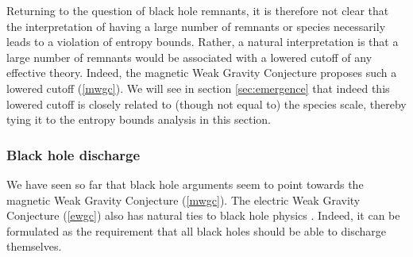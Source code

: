 \documentclass[11pt,a4paper]{article}
\numberwithin{equation}{section}
\numberwithin{table}{section}\setlength{\multlinegap}{25pt}
\begin{document}
Returning to the question of black hole remnants, it is therefore not clear that the interpretation of having a large number of remnants or species necessarily leads to a violation of entropy bounds. Rather, a natural interpretation is that a large number of remnants would be associated with a lowered cutoff of any effective theory. Indeed, the magnetic Weak Gravity Conjecture proposes such a lowered cutoff (\ref{mwgc}). We will see in section \ref{sec:emergence} that indeed this lowered cutoff is closely related to (though not equal to) the species scale, thereby tying it to the entropy bounds analysis in this section. 

\subsubsection{Black hole discharge}
\label{sec:bhdisch}

We have seen so far that black hole arguments seem to point towards the magnetic Weak Gravity Conjecture (\ref{mwgc}). The electric Weak Gravity Conjecture (\ref{ewgc}) also has natural ties to black hole physics \cite{ArkaniHamed:2006dz}. Indeed, it can be formulated as the requirement that all black holes should be able to discharge themselves. 
\end{document}

